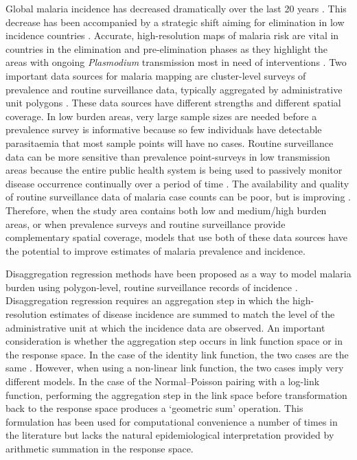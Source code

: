 \documentclass{statsoc}
\begin{document}
Global malaria incidence has decreased dramatically over the last 20 years \citep{bhatt2015effect, weiss2019mapping, battle2019mapping}.
This decrease has been accompanied by a strategic shift aiming for elimination in low incidence countries \citep{world2016world, newby2016path}.
Accurate, high-resolution maps of malaria risk are vital in countries in the elimination and pre-elimination phases as they highlight the areas with ongoing \emph{Plasmodium} transmission most in need of interventions \citep{sturrock2016mapping, cohen2017mapping}.
Two important data sources for malaria mapping are cluster-level surveys of prevalence \citep{gething2011new, bhatt2017improved, gething2012long, bhatt2015effect} and routine surveillance data, typically aggregated by administrative unit polygons \citep{sturrock2016mapping, ohrt2015information, cibulskis2011worldwide}.
These data sources have different strengths and different spatial coverage.
In low burden areas, very large sample sizes are needed before a prevalence survey is informative because so few individuals have detectable parasitaemia that most sample points will have no cases.
Routine surveillance data can be more sensitive than prevalence point-surveys in low transmission areas because the entire public health system is being used to passively monitor disease occurrence continually over a period of time \citep{cibulskis2011worldwide}.
The availability and quality of routine surveillance data of malaria case counts can be poor, but is improving \citep{ohrt2015information, cibulskis2011worldwide}.
Therefore, when the study area contains both low and medium/high burden areas, or when prevalence surveys and routine surveillance provide complementary spatial coverage, models that use both of these data sources have the potential to improve estimates of malaria prevalence and incidence.

Disaggregation regression methods have been proposed as a way to model malaria burden using polygon-level, routine surveillance records of incidence \citep{sturrock2014fine, wilson2017pointless, taylor2017continuous, li2012log, johnson2019spatially, arambepola2020simulation}.
Disaggregation regression requires an aggregation step in which the high-resolution estimates of disease incidence are summed to match the level of the administrative unit at which the incidence data are observed.
An important consideration is whether the aggregation step occurs in link function space or in the response space.
In the case of the identity link function, the two cases are the same \citep{moraga2017geostatistical, roksvaag2019knowledge, wilson2017pointless}.
However, when using a non-linear link function, the two cases imply very different models.
In the case of the Normal--Poisson pairing  with a log-link function, performing the aggregation step in the link space before transformation back to the response space produces  a `geometric sum' operation.
This formulation has been used for computational convenience a number of times in the literature \citep{wang2018generalized, liu2011empirical} but lacks the natural epidemiological interpretation provided by arithmetic summation in the response space.
\end{document}
